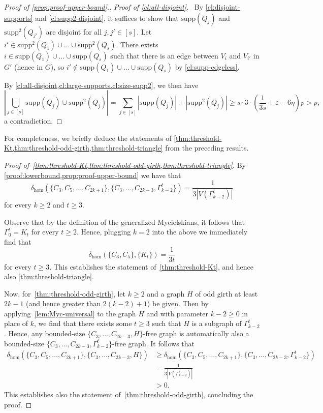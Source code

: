 \documentclass{article}
\newcommand{\supp}{\text{supp}}
\newcommand{\mydiamond}{\rotatebox[origin=c]{45}{$\vcenter{\hbox{$\Box$}}$}}
\newenvironment{subproof}[1]{\par\noindent \textit{Proof of #1.}\ }{\hfill \mydiamond \par\vspace{11pt}}
\begin{document}
\begin{proof}[Proof of \cref{prop:proof-upper-bound}.]
    \begin{subproof}{\cref{cl:all-disjoint}}
        By \cref{cl:disjoint-supports} and \cref{cl:supp2-disjoint}, it suffices to show that $\supp(Q_j)$ and $\supp^2(Q_{j'})$ are disjoint for all $j, j' \in [s]$.
        Let $i' \in \supp^2(Q_1) \cup \ldots \cup \supp^2(Q_{s})$. 
        There exists $i \in \supp(Q_1) \cup \ldots \cup \supp(Q_{s})$ such that there is an edge between $V_i$ and $V_{i'}$ in $G'$ (hence in $G$), so $i' \notin \supp(Q_1) \cup \ldots \cup \supp(Q_{s})$ by \cref{cl:supp-edgeless}.
    \end{subproof}
    
    By \cref{cl:all-disjoint,cl:large-supports,cl:size-supp2}, we then have \[\left|\bigcup_{j \in [s]} \supp(Q_j) \cup \supp^2(Q_j)\right| = \sum_{j \in [s]} |\supp(Q_j)| + |\supp^2(Q_j)| \geq s \cdot 3 \cdot \left(\frac{1}{3s}+\varepsilon-6\eta\right)p > p,\] a contradiction. 
\end{proof}

For completeness, we briefly deduce the statements of \cref{thm:threshold-Kt,thm:threshold-odd-girth,thm:threshold-triangle} from the preceding results.

\begin{proof}[Proof of~\cref{thm:threshold-Kt,thm:threshold-odd-girth,thm:threshold-triangle}]
By \cref{proof:lowerbound,prop:proof-upper-bound} we have that \[\delta_{\hom}(\{C_3, C_5, \ldots, C_{2k+1}\}, \{C_3, \ldots, C_{2k-3}, \Gamma_{k-2}^t\}) = \frac{1}{3|V(\Gamma_{k-2}^t)|}\] for every $k \geq 2$ and $t \geq 3$. 

Observe that by the definition of the generalized Mycielskians, it follows that $\Gamma_0^t=K_t$ for every $t\ge 2$. Hence, plugging $k=2$ into the above we immediately find that
\[\delta_{\hom}(\{C_3, C_5\}, \{K_t\}) =\frac{1}{3t}\] for every $t \geq 3$. This establishes the statement of~\cref{thm:threshold-Kt}, and hence also \cref{thm:threshold-triangle}.

Now, for~\cref{thm:threshold-odd-girth}, let $k\ge 2$ and a graph $H$ of odd girth at least $2k-1$ (and hence greater than $2(k-2)+1$) be given. Then by applying~\cref{lem:Myc-universal} to the graph $H$ and with parameter $k-2\ge 0$ in place of $k$, we find that there exists some $t\ge 3$ such that $H$ is a subgraph of $\Gamma_{k-2}^t$. Hence, any bounded-size $\{C_3, \ldots, C_{2k-3}, H\}$-free graph is automatically also a bounded-size $\{C_3,\ldots,C_{2k-3},\Gamma_{k-2}^t\}$-free graph. It follows that 
\begin{align*}\delta_{\hom}(\{C_3,C_5,\ldots,C_{2k+1}\},\{C_3,\ldots,C_{2k-3},H\})&\ge \delta_{\hom}(\{C_3,C_5,\ldots,C_{2k+1}\},\{C_3,\ldots,C_{2k-3},\Gamma_{k-2}^t\})\\ &=\frac{1}{3|V(\Gamma_{k-2}^t)|}\\&>0.\end{align*} This establishes also the statement of~\cref{thm:threshold-odd-girth}, concluding the proof.
\end{proof}




\end{document}

